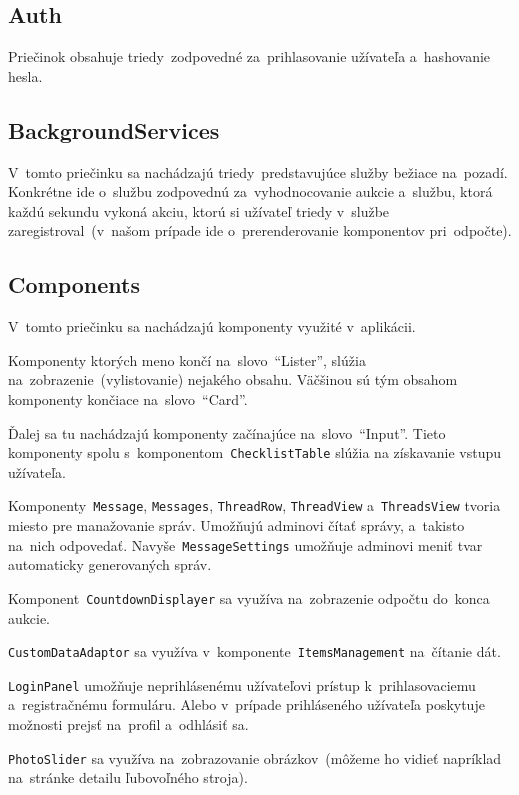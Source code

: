\subsection{Auth}

Priečinok obsahuje triedy~zodpovedné za~prihlasovanie užívateľa a~hashovanie hesla.

\subsection{BackgroundServices}

V~tomto priečinku sa nachádzajú triedy~predstavujúce služby bežiace na~pozadí. Konkrétne ide o~službu zodpovednú za~vyhodnocovanie aukcie a~službu, ktorá každú sekundu vykoná akciu, ktorú si užívateľ triedy v~službe zaregistroval~(v~našom prípade ide o~prerenderovanie komponentov pri~odpočte).

\subsection{Components}

V~tomto priečinku sa nachádzajú komponenty využité v~aplikácii.

Komponenty ktorých meno končí na~slovo~``Lister'', slúžia na~zobrazenie~(vylistovanie) nejakého obsahu. Väčšinou sú tým obsahom komponenty končiace na~slovo~``Card''.

Ďalej sa tu nachádzajú komponenty začínajúce na~slovo~``Input''. Tieto komponenty spolu s~komponentom~\verb|ChecklistTable| slúžia na získavanie vstupu užívateľa.

Komponenty~\verb|Message|, \verb|Messages|, \verb|ThreadRow|, \verb|ThreadView| a~\verb|ThreadsView| tvoria miesto pre manažovanie správ. Umožňujú adminovi čítať správy, a~takisto na~nich odpovedať. Navyše~\verb|MessageSettings| umožňuje adminovi meniť tvar automaticky generovaných správ.

Komponent~\verb|CountdownDisplayer| sa využíva na~zobrazenie odpočtu do~konca aukcie.

\verb|CustomDataAdaptor| sa využíva v~komponente~\verb|ItemsManagement| na~čítanie dát.

\verb|LoginPanel| umožňuje neprihlásenému užívateľovi prístup k~prihlasovaciemu a~registračnému formuláru. Alebo v~prípade prihláseného užívateľa poskytuje možnosti prejsť na~profil a~odhlásiť sa.

\verb|PhotoSlider| sa využíva na~zobrazovanie obrázkov~(môžeme ho vidieť napríklad na~stránke detailu ľubovoľného stroja).

